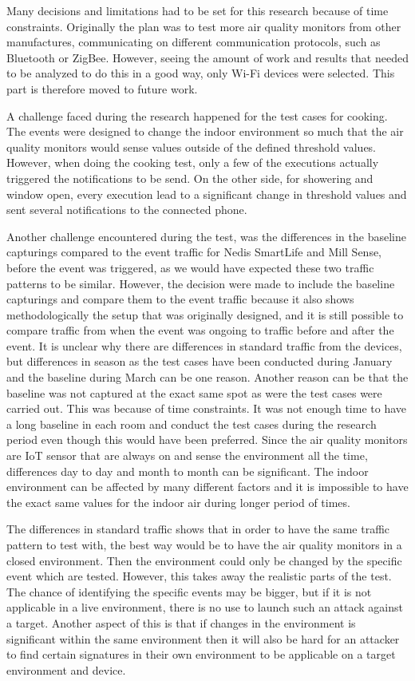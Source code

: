 Many decisions and limitations had to be set for this research because of time constraints. Originally the plan was to test more air quality monitors from other manufactures, communicating on different communication protocols, such as Bluetooth or ZigBee. However, seeing the amount of work and results that needed to be analyzed to do this in a good way, only \gls{Wi-Fi} devices were selected. This part is therefore moved to future work.  

A challenge faced during the research happened for the test cases for cooking. The events were designed to change the indoor environment so much that the air quality monitors would sense values outside of the defined threshold values. However, when doing the cooking test, only a few of the executions actually triggered the notifications to be send. On the other side, for showering and window open, every execution lead to a significant change in threshold values and sent several notifications to the connected phone. 

Another challenge encountered during the test, was the differences in the baseline capturings compared to the event traffic for Nedis SmartLife and Mill Sense, before the event was triggered, as we would have expected these two traffic patterns to be similar. However, the decision were made to include the baseline capturings and compare them to the event traffic because it also shows methodologically the setup that was originally designed, and it is still possible to compare traffic from when the event was ongoing to traffic before and after the event. It is unclear why there are differences in standard traffic from the devices, but differences in season as the test cases have been conducted during January and the baseline during March can be one reason. Another reason can be that the baseline was not captured at the exact same spot as were the test cases were carried out. This was because of time constraints. It was not enough time to have a long baseline in each room and conduct the test cases during the research period even though this would have been preferred. Since the air quality monitors are \gls{IoT} sensor that are always on and sense the environment all the time, differences day to day and month to month can be significant. The indoor environment can be affected by many different factors and it is impossible to have the exact same values for the indoor air during longer period of times. 

The differences in standard traffic shows that in order to have the same traffic pattern to test with, the best way would be to have the air quality monitors in a closed environment. Then the environment could only be changed by the specific event which are tested. However, this takes away the realistic parts of the test. The chance of identifying the specific events may be bigger, but if it is not applicable in a live environment, there is no use to launch such an attack against a target. Another aspect of this is that if changes in the environment is significant within the same environment then it will also be hard for an attacker to find certain signatures in their own environment to be applicable on a target environment and device. 